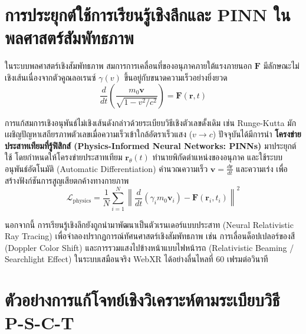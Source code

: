 \section{การประยุกต์ใช้การเรียนรู้เชิงลึกและ PINN ในพลศาสตร์สัมพัทธภาพ}

ในระบบพลศาสตร์เชิงสัมพัทธภาพ สมการการเคลื่อนที่ของอนุภาคภายใต้แรงภายนอก $\mathbf{F}$ มีลักษณะไม่เชิงเส้นเนื่องจากตัวคูณลอเรนซ์ $\gamma(v)$ ขึ้นอยู่กับขนาดความเร็วอย่างยิ่งยวด
\begin{equation}
\frac{d}{dt}\left(\frac{m_0 \mathbf{v}}{\sqrt{1 - v^2/c^2}}\right) = \mathbf{F}(\mathbf{r}, t)
\end{equation}

การแก้สมการเชิงอนุพันธ์ไม่เชิงเส้นดังกล่าวด้วยระเบียบวิธีเชิงตัวเลขดั้งเดิม เช่น Runge-Kutta มักเผชิญปัญหาเสถียรภาพตัวเลขเมื่อความเร็วเข้าใกล้อัตราเร็วแสง ($v \to c$) ปัจจุบันได้มีการนำ \textbf{โครงข่ายประสาทเทียมที่รู้ฟิสิกส์ (Physics-Informed Neural Networks: PINNs)} มาประยุกต์ใช้ โดยกำหนดให้โครงข่ายประสาทเทียม $\mathbf{r}_{\theta}(t)$ ทำนายพิกัดตำแหน่งของอนุภาค และใช้ระบบอนุพันธ์อัตโนมัติ (Automatic Differentiation) คำนวณความเร็ว $\mathbf{v} = \frac{d\mathbf{r}}{dt}$ และความเร่ง เพื่อสร้างฟังก์ชันการสูญเสียตกค้างทางกายภาพ
\begin{equation}
\mathcal{L}_{\text{physics}} = \frac{1}{N}\sum_{i=1}^{N} \left\| \frac{d}{dt}\left(\gamma_i m_0 \mathbf{v}_i\right) - \mathbf{F}(\mathbf{r}_i, t_i) \right\|^2
\end{equation}

นอกจากนี้ การเรียนรู้เชิงลึกยังถูกนำมาพัฒนาเป็นตัวเรนเดอร์แบบประสาท (Neural Relativistic Ray Tracing) เพื่อจำลองปรากฏการณ์ทัศนศาสตร์เชิงสัมพัทธภาพ เช่น การเลื่อนด็อปเปลอร์ของสี (Doppler Color Shift) และการรวมแสงไปข้างหน้าแบบไฟหน้ารถ (Relativistic Beaming / Searchlight Effect) ในระบบเสมือนจริง WebXR ได้อย่างลื่นไหลที่ 60 เฟรมต่อวินาที

\section{ตัวอย่างการแก้โจทย์เชิงวิเคราะห์ตามระเบียบวิธี P-S-C-T}

